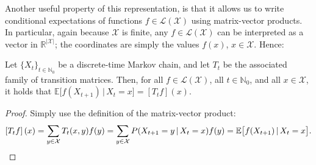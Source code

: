\documentclass[graybox]{svmult}
\newcommand{\nats}{\mathbb{N}}
\newcommand{\natswith}{\nats_{0}}
\newcommand{\reals}{\mathbb{R}}
\newcommand{\states}{\mathcal{X}}
\newcommand{\gambles}{\mathcal{L}}
\newcommand{\gamblesX}{\gambles(\states)}
\begin{document}
Another useful property of this representation, is that it allows us to write conditional expectations of functions $f\in\gamblesX$ using matrix-vector products. In particular, again because $\states$ is finite, any $f\in\gamblesX$ can be interpreted as a vector in $\reals^{\lvert\states\rvert}$; the coordinates are simply the values $f(x)$, $x\in\states$. Hence:
\begin{proposition}\label{prop:expectation_using_transmat}
Let $\{X_t\}_{t\in\natswith}$ be a discrete-time Markov chain, and let $T_t$ be the associated family of transition matrices. Then, for all $f\in\gamblesX$, all $t\in\natswith$, and all $x\in\states$, it holds that $\mathbb{E}\bigl[f(X_{t+1})\,\vert\,X_t=x\bigr] = \left[T_tf\right](x)$.
\end{proposition}
\begin{proof}
Simply use the definition of the matrix-vector product: 
\begin{equation*}
\left[T_tf\right](x)=\sum_{y\in\states}T_t(x,y)f(y)=\sum_{y\in\states}P(X_{t+1}=y\,\vert\,X_t=x)f(y) = \mathbb{E}\bigl[f(X_{t+1})\,\vert\,X_t=x\bigr].
\vspace{-16pt}
\end{equation*}
\end{proof}
\end{document}
